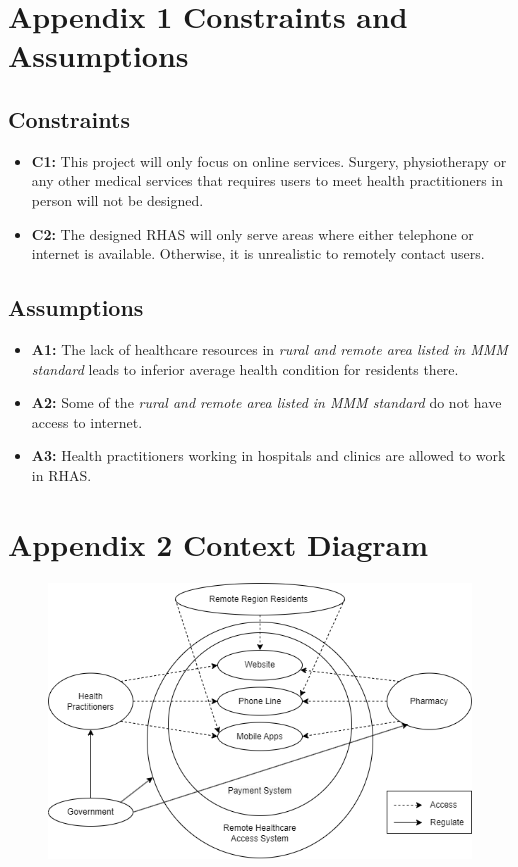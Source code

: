 \documentclass{article}
\begin{document}
\section{Appendix 1 Constraints and Assumptions}
\subsection{Constraints}
\begin{itemize}[label={}]
\item \textbf{C1:} This project will only focus on online services. Surgery, physiotherapy or any other medical services that requires users to meet health practitioners in person will not be designed.
\item \textbf{C2:} The designed RHAS will only serve areas where either telephone or internet is available. Otherwise, it is unrealistic to remotely contact users.
\end{itemize}
\subsection{Assumptions}
\begin{itemize}[label={}]
\item \textbf{A1:} The lack of healthcare resources in \textit{rural and remote area listed in MMM standard} leads to inferior average health condition for residents there.
\item \textbf{A2:} Some of the \textit{rural and remote area listed in MMM standard} do not have access to internet.
\item \textbf{A3:} Health practitioners working in hospitals and clinics are allowed to work in RHAS.
\end{itemize}
\section{Appendix 2 Context Diagram}
\begin{figure}[h]
    \centering
    \includegraphics[scale=0.5]{Context Diagram}
    \label{1-2-a}
\end{figure}
\end{document}
